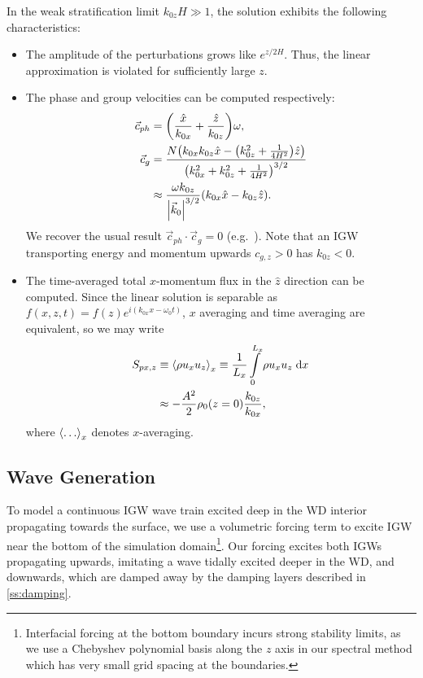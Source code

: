 \documentclass[twocolumn,
        nofootinbib, %
        usenames, %
        aps,
        prd,
        dvipsnames %
    ]{revtex4-1}%
\DeclarePairedDelimiter\abs{\lvert}{\rvert}
\DeclarePairedDelimiter\ev{\langle}{\rangle}
\DeclarePairedDelimiter\p{\lparen}{\rparen}
\begin{document}
In the weak stratification limit $k_{0z}H \gg 1$, the solution exhibits the
following characteristics:
\begin{itemize}
    \item The amplitude of the perturbations grows like $e^{z/2H}$. Thus, the
        linear approximation is violated for sufficiently large $z$.

    \item The phase and group velocities can be computed respectively:
        \begin{align}
            \vec{c}_{ph} &=
                \p*{\frac{\hat{x}}{k_{0x}} + \frac{\hat{z}}{k_{0z}}}\omega,\\
            \vec{c}_{g} &= \frac{N\p*{k_{0x}k_{0z}\hat{x}
                - \p*{k_{0z}^2 + \frac{1}{4H^2}}\hat{z}}}
                {\p*{k_{0x}^2 + k_{0z}^2 + \frac{1}{4H^2}}^{3/2}} \nonumber\\
                &\approx \frac{\omega k_{0z}}{\abs*{\vec{k}_0}^{3/2}}
                    \p*{k_{0x}\hat{x} - k_{0z}\hat{z}}.
        \end{align}
        We recover the usual result $\vec{c}_{ph} \cdot \vec{c}_g = 0$
        (e.g.\ \cite{drazin,sutherland1}). Note that an IGW transporting energy
        and momentum upwards $c_{g, z} > 0$ has $k_{0z} < 0$.

    \item The time-averaged total $x$-momentum flux in the $\hat{z}$ direction
        can be computed. Since the linear solution is separable as $f(x, z, t) =
        f(z)e^{i(k_{0x}x - \omega_0 t)}$, $x$ averaging and time averaging are
        equivalent, so we may write
        \begin{align}
            S_{px, z} &\equiv \ev*{\rho u_x u_z}_x \equiv
                \frac{1}{L_x}\int_0^{L_x}\limits \rho u_x u_z\;\mathrm{d}x
                    \nonumber\\
                &\approx -\frac{A^2}{2}\rho_0(z=0)\frac{k_{0z}}{k_{0x}},
                    \label{eq:fpx_lin}
        \end{align}
        where $\ev*{\dots}_x$ denotes $x$-averaging.
\end{itemize}

\subsection{Wave Generation}

To model a continuous IGW wave train excited deep in the WD interior propagating
towards the surface, we use a volumetric forcing term to excite IGW near the
bottom of the simulation domain\footnote{Interfacial forcing at the bottom
boundary incurs strong stability limits, as we use a Chebyshev polynomial basis
along the $z$ axis in our spectral method which has very small grid spacing at
the boundaries.}. Our forcing excites both IGWs propagating upwards, imitating a
wave tidally excited deeper in the WD, and downwards, which are damped away by
the damping layers described in \autoref{ss:damping}.
\end{document}
